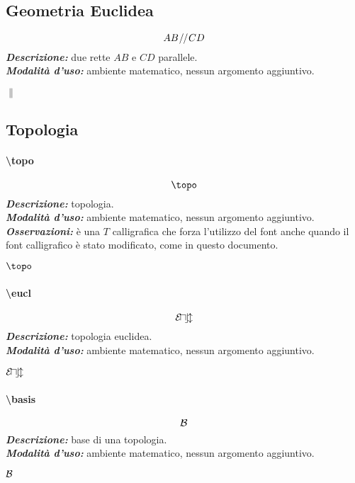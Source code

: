 \subsection{Geometria Euclidea}
\begin{equation*}
	AB \mathbin{\!{/}\mkern-1.5mu{/}\!} CD
\end{equation*}
\textbf{\textit{Descrizione:}} due rette $AB$ e $CD$ parallele.\\
\noindent\textbf{\textit{Modalità d'uso:}} ambiente matematico, nessun argomento aggiuntivo.
\begin{codelatex}
$\parallel$
\end{codelatex}
\subsection{Topologia}
\paragraph{\textbackslash topo}
\begin{equation*}
	\topo
\end{equation*}
\textbf{\textit{Descrizione:}} topologia.\\
\noindent\textbf{\textit{Modalità d'uso:}} ambiente matematico, nessun argomento aggiuntivo.\\
\textbf{\textit{Osservazioni:}} è una $T$ calligrafica che forza l'utilizzo del font  anche quando il font calligrafico è stato modificato, come in questo documento.
\begin{codelatex}
$\topo$
\end{codelatex}
\paragraph{\textbackslash eucl}
\begin{equation*}
	\mathcal{E\! u\! c\! l}
\end{equation*}
\textbf{\textit{Descrizione:}} topologia euclidea.\\
\noindent\textbf{\textit{Modalità d'uso:}} ambiente matematico, nessun argomento aggiuntivo.
\begin{codelatex}
$\mathcal{E\! u\! c\! l}$
\end{codelatex}
\paragraph{\textbackslash basis}
\begin{equation*}
	\mathcal{B}
\end{equation*}
\textbf{\textit{Descrizione:}} base di una topologia.\\
\noindent\textbf{\textit{Modalità d'uso:}} ambiente matematico, nessun argomento aggiuntivo.
\begin{codelatex}
$\mathcal{B}$
\end{codelatex}
